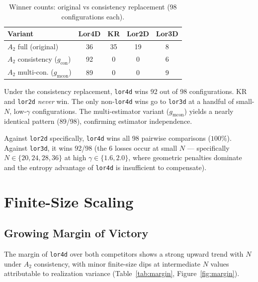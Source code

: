 \documentclass[11pt,a4paper]{article}
\begin{document}
\begin{table}[H]
\centering
\caption{Winner counts: original vs consistency replacement (98 configurations each).}
\label{tab:replacement}
\begin{tabular}{lcccc}
\toprule
\textbf{Variant} & \textbf{Lor4D} & \textbf{KR} & \textbf{Lor2D} & \textbf{Lor3D} \\
\midrule
$A_2$ full (original) & 36 & 35 & 19 & 8 \\
$A_2$ consistency ($g_{\text{con}}$) & 92 & 0 & 0 & 6 \\
$A_2$ multi-con. ($g_{\text{mcon}}$) & 89 & 0 & 0 & 9 \\
\bottomrule
\end{tabular}
\end{table}

Under the consistency replacement, \texttt{lor4d} wins 92 out of 98 configurations. KR and \texttt{lor2d} \emph{never} win. The only non-\texttt{lor4d} wins go to \texttt{lor3d} at a handful of small-$N$, low-$\gamma$ configurations. The multi-estimator variant ($g_{\text{mcon}}$) yields a nearly identical pattern (89/98), confirming estimator independence.

Against \texttt{lor2d} specifically, \texttt{lor4d} wins all 98 pairwise comparisons ($100\%$). Against \texttt{lor3d}, it wins 92/98 (the 6 losses occur at small $N$ --- specifically $N \in \{20, 24, 28, 36\}$ at high $\gamma \in \{1.6, 2.0\}$, where geometric penalties dominate and the entropy advantage of \texttt{lor4d} is insufficient to compensate).

\section{Finite-Size Scaling}\label{sec:scaling}

\subsection{Growing Margin of Victory}

The margin of \texttt{lor4d} over both competitors shows a strong upward trend with $N$ under $A_2$ consistency, with minor finite-size dips at intermediate $N$ values attributable to realization variance (Table~\ref{tab:margin}, Figure~\ref{fig:margin}).
\end{document}
